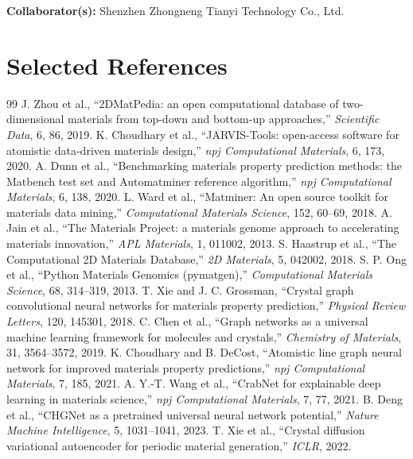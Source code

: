 \documentclass[10pt,a4paper]{article}
\begin{document}
\textbf{Collaborator(s):} Shenzhen Zhongneng Tianyi Technology Co., Ltd.

\section{Selected References}
\small
\begin{thebibliography}{99}
\setlength{\itemsep}{-1pt}
 J. Zhou et al., ``2DMatPedia: an open computational database of two-dimensional materials from top-down and bottom-up approaches,'' \textit{Scientific Data}, 6, 86, 2019.
 K. Choudhary et al., ``JARVIS-Tools: open-access software for atomistic data-driven materials design,'' \textit{npj Computational Materials}, 6, 173, 2020.
 A. Dunn et al., ``Benchmarking materials property prediction methods: the Matbench test set and Automatminer reference algorithm,'' \textit{npj Computational Materials}, 6, 138, 2020.
 L. Ward et al., ``Matminer: An open source toolkit for materials data mining,'' \textit{Computational Materials Science}, 152, 60--69, 2018.
 A. Jain et al., ``The Materials Project: a materials genome approach to accelerating materials innovation,'' \textit{APL Materials}, 1, 011002, 2013.
 S. Haastrup et al., ``The Computational 2D Materials Database,'' \textit{2D Materials}, 5, 042002, 2018.
 S. P. Ong et al., ``Python Materials Genomics (pymatgen),'' \textit{Computational Materials Science}, 68, 314--319, 2013.
 T. Xie and J. C. Grossman, ``Crystal graph convolutional neural networks for materials property prediction,'' \textit{Physical Review Letters}, 120, 145301, 2018.
 C. Chen et al., ``Graph networks as a universal machine learning framework for molecules and crystals,'' \textit{Chemistry of Materials}, 31, 3564--3572, 2019.
 K. Choudhary and B. DeCost, ``Atomistic line graph neural network for improved materials property predictions,'' \textit{npj Computational Materials}, 7, 185, 2021.
 A. Y.-T. Wang et al., ``CrabNet for explainable deep learning in materials science,'' \textit{npj Computational Materials}, 7, 77, 2021.
 B. Deng et al., ``CHGNet as a pretrained universal neural network potential,'' \textit{Nature Machine Intelligence}, 5, 1031--1041, 2023.
 T. Xie et al., ``Crystal diffusion variational autoencoder for periodic material generation,'' \textit{ICLR}, 2022.

\end{thebibliography}
\end{document}
